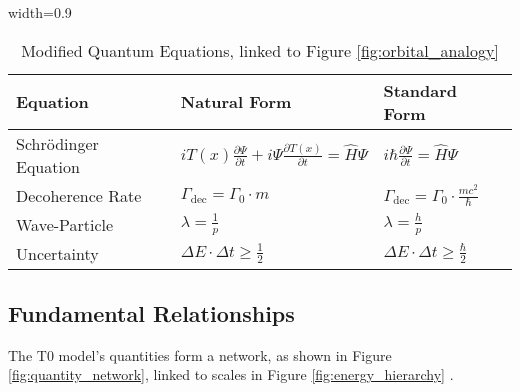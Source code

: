 \documentclass[12pt,a4paper]{article}
\newcommand{\Tfield}{T(x)}
\newcommand{\tablescale}{0.9}
\begin{document}
	\begin{table}[htbp]
		\centering
		\begin{adjustbox}{width=\tablescale\textwidth}
			\begin{tabular}{lll}
				\toprule
				\textbf{Equation} & \textbf{Natural Form} & \textbf{Standard Form} \\
				\midrule
				Schrödinger Equation & \(i \Tfield \frac{\partial \Psi}{\partial t} + i \Psi \frac{\partial \Tfield}{\partial t} = \hat{H} \Psi\) & \(i \hbar \frac{\partial \Psi}{\partial t} = \hat{H} \Psi\) \\
				Decoherence Rate & \(\Gamma_{\text{dec}} = \Gamma_0 \cdot m\) & \(\Gamma_{\text{dec}} = \Gamma_0 \cdot \frac{m c^2}{\hbar}\) \\
				Wave-Particle & \(\lambda = \frac{1}{p}\) & \(\lambda = \frac{h}{p}\) \\
				Uncertainty & \(\Delta E \cdot \Delta t \geq \frac{1}{2}\) & \(\Delta E \cdot \Delta t \geq \frac{\hbar}{2}\) \\
				\bottomrule
			\end{tabular}
		\end{adjustbox}
		\caption{Modified Quantum Equations, linked to Figure \ref{fig:orbital_analogy}}
		\label{tab:qm_equations}
	\end{table}
	
	\subsection{Fundamental Relationships}
	\label{subsec:relationships}
	
	The T0 model’s quantities form a network, as shown in Figure \ref{fig:quantity_network}, linked to scales in Figure \ref{fig:energy_hierarchy} \cite{pascher_grundkraefte_2025}.
	
\end{document}
